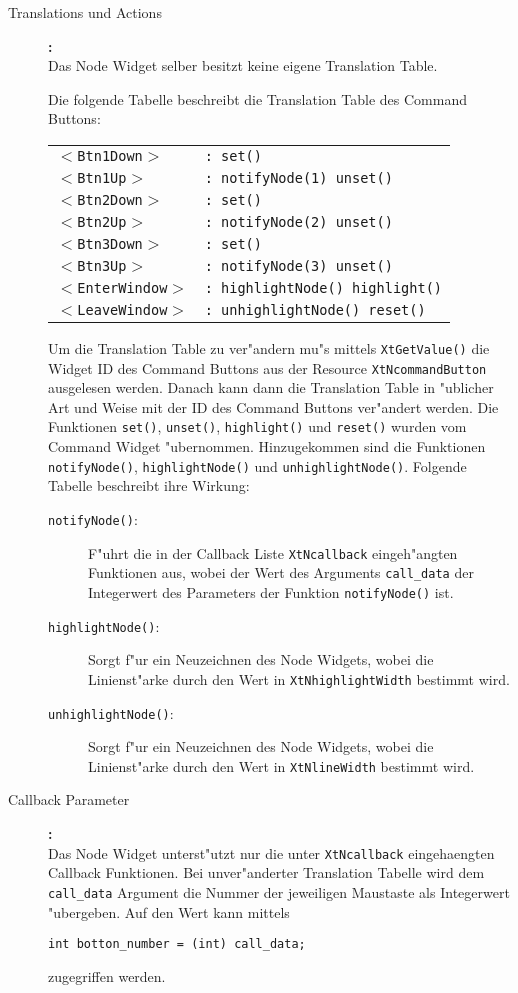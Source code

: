 \begin{description}
\item[Translations und Actions]
   {\bf:\\}
   Das Node Widget selber besitzt keine eigene Translation Table.

   Die folgende Tabelle beschreibt die Translation Table des Command Buttons:

   \begin{tabular}{ll} 
   {\tt $<$Btn1Down$>$} & {\tt : set()} \\
   {\tt $<$Btn1Up$>$} & {\tt : notifyNode(1) unset()} \\
   {\tt $<$Btn2Down$>$} & {\tt : set()} \\
   {\tt $<$Btn2Up$>$} & {\tt : notifyNode(2) unset()} \\
   {\tt $<$Btn3Down$>$} & {\tt : set()} \\
   {\tt $<$Btn3Up$>$} & {\tt : notifyNode(3) unset()} \\
   {\tt $<$EnterWindow$>$} & {\tt : highlightNode() highlight()} \\
   {\tt $<$LeaveWindow$>$} & {\tt : unhighlightNode() reset()}
   \end{tabular}

   Um die Translation Table zu ver"andern mu"s mittels {\tt XtGetValue()}
   die Widget ID des Command Buttons aus der Resource {\tt XtNcommandButton}
   ausgelesen werden. Danach kann dann die Translation Table in "ublicher
   Art und Weise mit der ID des Command Buttons ver"andert werden.
   Die Funktionen {\tt set()}, {\tt unset()}, {\tt highlight()} und 
   {\tt reset()} wurden vom Command Widget "ubernommen. 
   Hinzugekommen sind die Funktionen {\tt notifyNode()}, 
   {\tt highlightNode()} und {\tt unhighlightNode()}.
   Folgende Tabelle beschreibt ihre Wirkung:

   \begin{description}
   \item[{\tt notifyNode()}:]
      F"uhrt die in der Callback Liste {\tt XtNcallback} eingeh"angten
      Funktionen aus, wobei der Wert des Arguments {\tt call\_data}
      der Integerwert des Parameters der Funktion {\tt notifyNode()}
      ist.
   \item[{\tt highlightNode()}:]
      Sorgt f"ur ein Neuzeichnen des Node Widgets, wobei die Linienst"arke
      durch den Wert in {\tt XtNhighlightWidth} bestimmt wird.
   \item[{\tt unhighlightNode()}:]
      Sorgt f"ur ein Neuzeichnen des Node Widgets, wobei die Linienst"arke
      durch den Wert in {\tt XtNlineWidth} bestimmt wird.
   \end{description}

\item[Callback Parameter]
   {\bf:\\}
   Das Node Widget unterst"utzt nur die unter {\tt XtNcallback} 
   eingehaengten Callback Funktionen. Bei unver"anderter Translation Tabelle
   wird dem {\tt call\_data} Argument die Nummer der jeweiligen Maustaste
   als Integerwert "ubergeben.
   Auf den Wert kann mittels

   {\tt int botton\_number = (int) call\_data;}

   zugegriffen werden.
\end{description}

